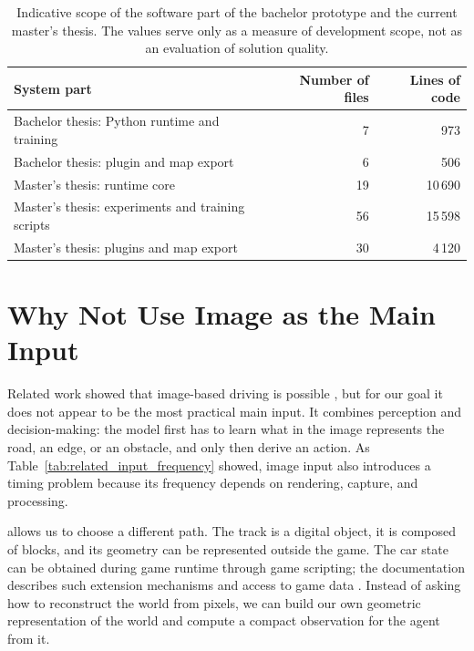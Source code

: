 \begin{table}[htbp]
    \centering
    \small
    \setlength{\tabcolsep}{5pt}
    \renewcommand{\arraystretch}{1.15}
    \caption[Indicative scope of the software part]{Indicative scope of the software part of the bachelor prototype and the current master's thesis. The values serve only as a measure of development scope, not as an evaluation of solution quality.}
    \label{tab:code_scope_bc_vs_diploma}
    \begin{tabular}{lrr}
        \toprule
        System part & Number of files & Lines of code \\
        \midrule
        Bachelor thesis: Python runtime and training & 7 & 973 \\
        Bachelor thesis: plugin and map export & 6 & 506 \\
        \midrule
        Master's thesis: runtime core & 19 & 10\,690 \\
        Master's thesis: experiments and training scripts & 56 & 15\,598 \\
        Master's thesis: plugins and map export & 30 & 4\,120 \\
        \bottomrule
    \end{tabular}
\end{table}

\section{Why Not Use Image as the Main Input}

Related work showed that image-based driving is possible \cite{bojarski2016endtoend}, but for our goal it does not appear to be the most practical main input. It combines perception and decision-making: the model first has to learn what in the image represents the road, an edge, or an obstacle, and only then derive an action. As Table~\ref{tab:related_input_frequency} showed, image input also introduces a timing problem because its frequency depends on rendering, capture, and processing.

\Trackmania{} allows us to choose a different path. The track is a digital object, it is composed of blocks, and its geometry can be represented outside the game. The car state can be obtained during game runtime through game scripting; the \OpenPlanet{} documentation describes such extension mechanisms and access to game data \cite{openplanet_wiki2026}. Instead of asking how to reconstruct the world from pixels, we can build our own geometric representation of the world and compute a compact observation for the agent from it.

